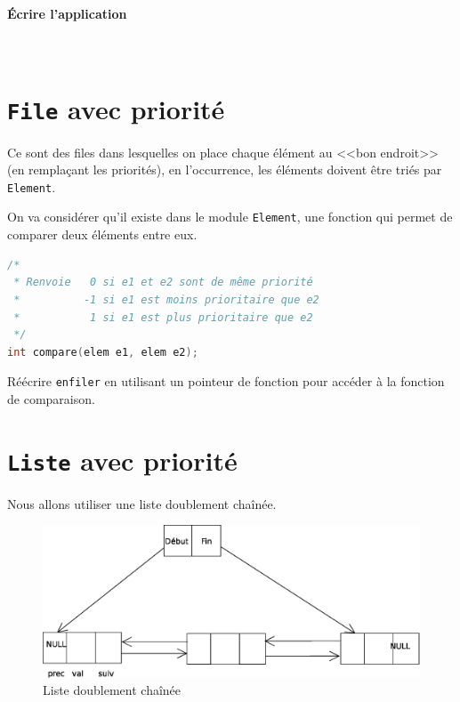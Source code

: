 
\paragraph{Écrire l'application} ~

\section{\texttt{File} avec priorité}
Ce sont des files dans lesquelles on place chaque élément au <<bon endroit>> (en remplaçant les priorités), en l'occurrence, les éléments doivent être triés par
\texttt{Element}.

On va considérer qu'il existe dans le module \texttt{Element}, une fonction qui permet de comparer deux éléments entre eux.
\begin{lstlisting}[language=C, numbers=none,caption=Element -- Prototype \texttt{comparer}]
/*
 * Renvoie   0 si e1 et e2 sont de même priorité
 *			-1 si e1 est moins prioritaire que e2
 *           1 si e1 est plus prioritaire que e2
 */
int compare(elem e1, elem e2);
\end{lstlisting}
Réécrire \texttt{enfiler} en utilisant un pointeur de fonction pour accéder à la fonction de comparaison.
\section{\texttt{Liste} avec priorité}
Nous allons utiliser une liste doublement chaînée.
\begin{figure}[H]
	\centering
\includegraphics[width=12cm]{content/schemas/fileDoubleChaine.eps}
	\caption{Liste doublement chaînée}
\end{figure}

